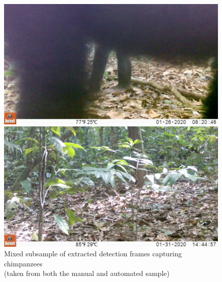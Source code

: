 \begin{figure}[htbp]
    \begin{minipage}[t]{0.48\textwidth}
        \centering
        \includegraphics[width=\linewidth]{body/experimental/assets/detection_frames/frame7}
    \end{minipage}
    \begin{minipage}[t]{0.48\textwidth}
        \centering
        \includegraphics[width=\linewidth]{body/experimental/assets/detection_frames/frame8}
    \end{minipage}
    \caption{Mixed subsample of extracted detection frames capturing chimpanzees\\
    (taken from both the manual and automated sample)}
    \label{fig:detection_frames}
\end{figure}



